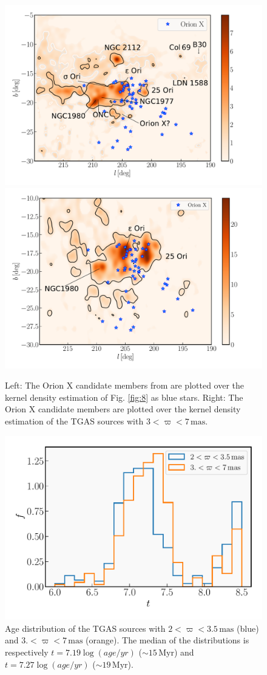 \documentclass[onecolumn]{aa} %
\begin{document}
\begin{figure}
\includegraphics[width = 0.5\hsize]{orionX.pdf} %
\vspace{0.1cm}
\includegraphics[width = 0.5\hsize]{kdeOrionX2.pdf} 
\caption{Left: The Orion X candidate members from \cite{Bouy2015} are plotted over the kernel density estimation of Fig. \ref{fig:8} as blue stars. Right: The Orion X candidate members are plotted over the kernel density estimation of the TGAS sources with $3 < \varpi < 7 \, \mathrm{mas}$.}
\label{fig:11}
\end{figure}


\begin{figure}
\includegraphics[width = \hsize]{agesForeground.pdf}
\caption{Age distribution of the TGAS sources with $2 < \varpi < 3.5 \, \mathrm{mas}$ (blue) and $3. < \varpi < 7 \, \mathrm{mas}$ (orange). The median of the distributions is respectively $t = 7.19 \log(age/yr)$ ($\sim 15 \, \mathrm{Myr}$) and $t = 7.27  \log(age/yr)$ ($\sim 19 \, \mathrm{Myr}$).}
\label{fig:11b}
\end{figure}
\end{document}
